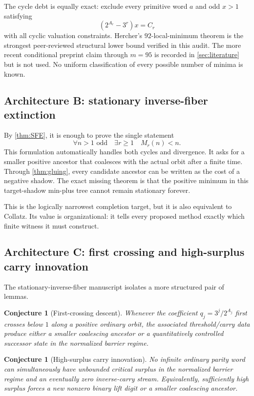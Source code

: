 \documentclass[11pt]{article}
\newtheorem{conjecture}[theorem]{Conjecture}
\theoremstyle{definition}
\theoremstyle{remark}
\begin{document}
The cycle debt is equally exact: exclude every primitive word $a$ and odd
$x>1$ satisfying
\[
 (2^{A_r}-3^r)x=C_r                                   \tag{11.4}
\]
with all cyclic valuation constraints.  Hercher's $92$-local-minimum theorem is the strongest peer-reviewed
structural lower bound verified in this audit.  The more recent conditional
preprint claim through $m=95$ is recorded in \cref{sec:literature} but is not
used.  No uniform classification of every possible number of minima is known.

\subsection{Architecture B: stationary inverse-fiber extinction}

By \cref{thm:SFE}, it is enough to prove the single statement
\[
 \boxed{
 \forall n>1\text{ odd}\quad\exists r\ge1\quad M_r(n)<n.
 }                                                       \tag{11.5}
\]
This formulation automatically handles both cycles and divergence.  It asks
for a smaller positive ancestor that coalesces with the actual orbit after a
finite time.  Through \cref{thm:gluing}, every candidate ancestor can be
written as the cost of a negative shadow.  The exact missing theorem is that
the positive minimum in this target-shadow min-plus tree cannot remain
stationary forever.

This is the logically narrowest completion target, but it is also equivalent
to Collatz.  Its value is organizational: it tells every proposed method
exactly which finite witness it must construct.

\subsection{Architecture C: first crossing and high-surplus carry innovation}

The stationary-inverse-fiber manuscript isolates a more structured pair of
lemmas.

\begin{conjecture}[First-crossing descent]\label{conj:FCD}
Whenever the coefficient $q_j=3^j/2^{A_j}$ first crosses below $1$ along a
positive ordinary orbit, the associated threshold/carry data produce either
a smaller coalescing ancestor or a quantitatively controlled successor state
in the normalized barrier regime.
\end{conjecture}

\begin{conjecture}[High-surplus carry innovation]\label{conj:HSCI}
No infinite ordinary parity word can simultaneously have unbounded critical
surplus in the normalized barrier regime and an eventually zero inverse-carry
stream.  Equivalently, sufficiently high surplus forces a new nonzero binary
lift digit or a smaller coalescing ancestor.
\end{conjecture}
\end{document}
